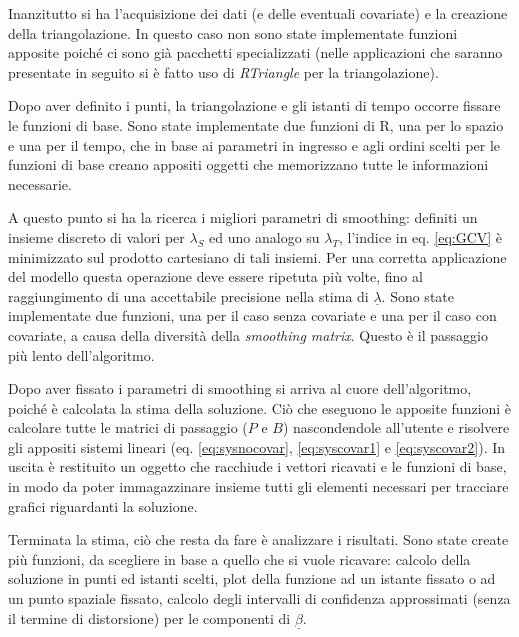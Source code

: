 \documentclass[a4paper,11pt,twoside,openright]{book}							%
\begin{document}
Inanzitutto si ha l'acquisizione dei dati (e delle eventuali covariate) e la creazione della triangolazione. In questo caso non sono state implementate funzioni apposite poiché ci sono già pacchetti specializzati (nelle applicazioni che saranno presentate in seguito si è fatto uso di \textit{RTriangle} per la triangolazione).

Dopo aver definito i punti, la triangolazione e gli istanti di tempo occorre fissare le funzioni di base. Sono state implementate due funzioni di R, una per lo spazio e una per il tempo, che in base ai parametri in ingresso e agli ordini scelti per le funzioni di base creano appositi oggetti che memorizzano tutte le informazioni necessarie.  

A questo punto si ha la ricerca i migliori parametri di smoothing: definiti un insieme discreto di valori per $\lambda_S$ ed uno analogo su $\lambda_T$, l'indice in eq. \ref{eq:GCV} è minimizzato sul prodotto cartesiano di tali insiemi. Per una corretta applicazione del modello questa operazione deve essere ripetuta più volte, fino al raggiungimento di una accettabile precisione nella stima di $\underline{\lambda}$. Sono state implementate due funzioni, una per il caso senza covariate e una per il caso con covariate, a causa della diversità della \textit{smoothing matrix}. Questo è il passaggio più lento dell'algoritmo.

Dopo aver fissato i parametri di smoothing si arriva al cuore dell'algoritmo, poiché è calcolata la stima della soluzione. Ciò che eseguono le apposite funzioni è calcolare tutte le matrici di passaggio ($P$ e $B$) nascondendole all'utente e risolvere gli appositi sistemi lineari (eq. \ref{eq:sysnocovar}, \ref{eq:syscovar1} e \ref{eq:syscovar2}). In uscita è restituito un oggetto che racchiude i vettori ricavati e le funzioni di base, in modo da poter immagazzinare insieme tutti gli elementi necessari per tracciare grafici riguardanti la soluzione.

Terminata la stima, ciò che resta da fare è analizzare i risultati. Sono state create più funzioni, da scegliere in base a quello che si vuole ricavare: calcolo della soluzione in punti ed istanti scelti, plot della funzione ad un istante fissato o ad un punto spaziale fissato, calcolo degli intervalli di confidenza approssimati (senza il termine di distorsione) per le componenti di $\underline{\beta}$.
\end{document}
